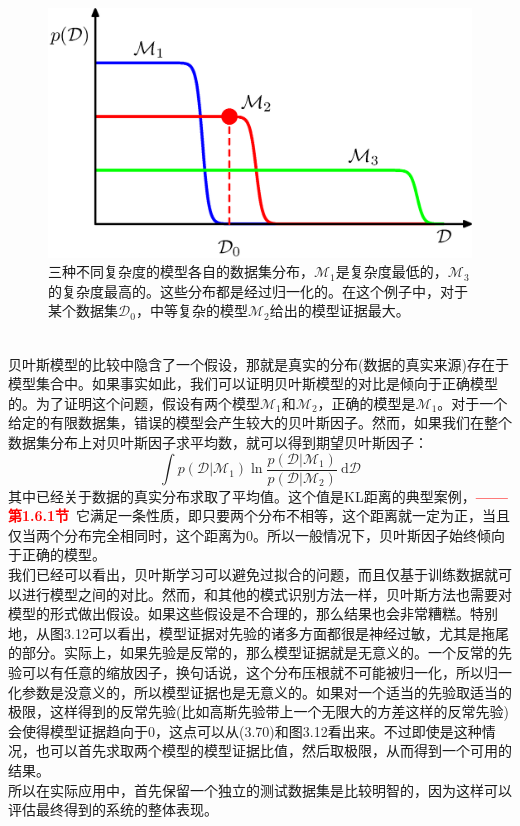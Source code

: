\documentclass[b5paper]{book}
\numberwithin{equation}{chapter}
\newcommand {\calD} {\mathcal{D}}
\begin{document}
{	\begin{figure}[ht]
		\centering
		\includegraphics[scale=0.8]{Images/3-13.png}
		\caption{三种不同复杂度的模型各自的数据集分布，$\mathcal{M}_1$是复杂度最低的，$\mathcal{M}_3$的复杂度最高的。这些分布都是经过归一化的。在这个例子中，对于某个数据集$\calD_0$，中等复杂的模型$\mathcal{M}_2$给出的模型证据最大。}
		\label{fig:3-13}
	\end{figure}
	\\
	\indent 贝叶斯模型的比较中隐含了一个假设，那就是真实的分布(数据的真实来源)存在于模型集合中。如果事实如此，我们可以证明贝叶斯模型的对比是倾向于正确模型的。为了证明这个问题，假设有两个模型$\mathcal{M}_1$和$\mathcal{M}_2$，正确的模型是$\mathcal{M}_1$。对于一个给定的有限数据集，错误的模型会产生较大的贝叶斯因子。然而，如果我们在整个数据集分布上对贝叶斯因子求平均数，就可以得到期望贝叶斯因子：
	\begin{equation}
		\int p(\mathcal{D}|\mathcal{M}_1)\ln \frac{p(\calD|\mathcal{M}_1)}{p(\calD|\mathcal{M}_2)}\ \mathrm{d}\mathcal{D}
	\end{equation}
	其中已经关于数据的真实分布求取了平均值。这个值是KL距离的典型案例，\textcolor{red}{\textbf{——第1.6.1节}}\ 它满足一条性质，即只要两个分布不相等，这个距离就一定为正，当且仅当两个分布完全相同时，这个距离为0。所以一般情况下，贝叶斯因子始终倾向于正确的模型。\\
	\indent 我们已经可以看出，贝叶斯学习可以避免过拟合的问题，而且仅基于训练数据就可以进行模型之间的对比。然而，和其他的模式识别方法一样，贝叶斯方法也需要对模型的形式做出假设。如果这些假设是不合理的，那么结果也会非常糟糕。特别地，从图3.12可以看出，模型证据对先验的诸多方面都很是神经过敏，尤其是拖尾的部分。实际上，如果先验是反常的，那么模型证据就是无意义的。一个反常的先验可以有任意的缩放因子，换句话说，这个分布压根就不可能被归一化，所以归一化参数是没意义的，所以模型证据也是无意义的。如果对一个适当的先验取适当的极限，这样得到的反常先验(比如高斯先验带上一个无限大的方差这样的反常先验)会使得模型证据趋向于0，这点可以从(3.70)和图3.12看出来。不过即使是这种情况，也可以首先求取两个模型的模型证据比值，然后取极限，从而得到一个可用的结果。\\
	\indent 所以在实际应用中，首先保留一个独立的测试数据集是比较明智的，因为这样可以评估最终得到的系统的整体表现。
	}
\end{document}
